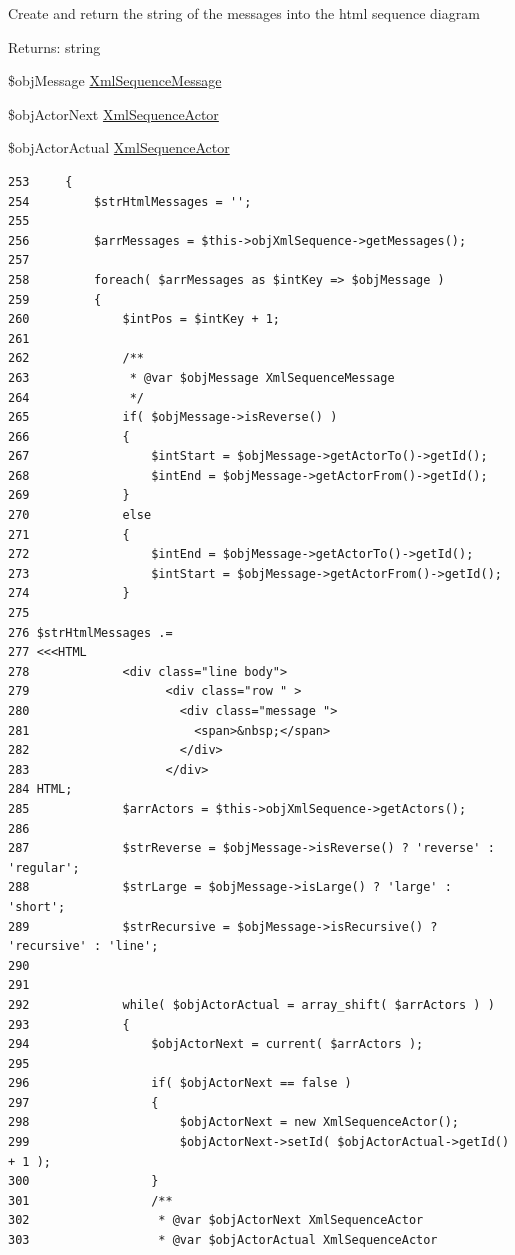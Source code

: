 Create and return the string of the messages into the html sequence diagram

\begin{Desc}
\item[Returns:]string \end{Desc}


\$objMessage \hyperlink{class_xml_sequence_message}{XmlSequenceMessage}

\$objActorNext \hyperlink{class_xml_sequence_actor}{XmlSequenceActor}

\$objActorActual \hyperlink{class_xml_sequence_actor}{XmlSequenceActor}

\begin{Code}\begin{verbatim}253     {
254         $strHtmlMessages = '';
255 
256         $arrMessages = $this->objXmlSequence->getMessages();
257         
258         foreach( $arrMessages as $intKey => $objMessage )
259         {
260             $intPos = $intKey + 1;
261 
262             /**
263              * @var $objMessage XmlSequenceMessage
264              */
265             if( $objMessage->isReverse() )
266             {
267                 $intStart = $objMessage->getActorTo()->getId();
268                 $intEnd = $objMessage->getActorFrom()->getId();
269             }
270             else
271             {
272                 $intEnd = $objMessage->getActorTo()->getId();
273                 $intStart = $objMessage->getActorFrom()->getId();
274             }
275 
276 $strHtmlMessages .=
277 <<<HTML
278             <div class="line body">
279                   <div class="row " >
280                     <div class="message ">
281                       <span>&nbsp;</span>
282                     </div>
283                   </div>
284 HTML;
285             $arrActors = $this->objXmlSequence->getActors();
286 
287             $strReverse = $objMessage->isReverse() ? 'reverse' : 'regular';
288             $strLarge = $objMessage->isLarge() ? 'large' : 'short';
289             $strRecursive = $objMessage->isRecursive() ? 'recursive' : 'line';
290 
291 
292             while( $objActorActual = array_shift( $arrActors ) )
293             {
294                 $objActorNext = current( $arrActors );
295 
296                 if( $objActorNext == false )
297                 {
298                     $objActorNext = new XmlSequenceActor();
299                     $objActorNext->setId( $objActorActual->getId() + 1 );
300                 }
301                 /**
302                  * @var $objActorNext XmlSequenceActor
303                  * @var $objActorActual XmlSequenceActor

\end{verbatim}
\end{Code}
